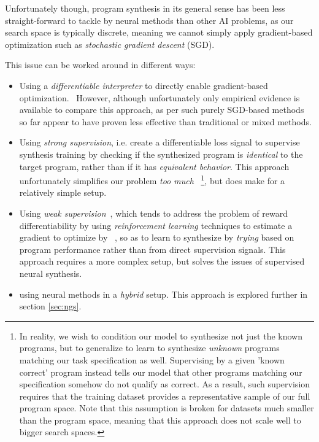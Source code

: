 \documentclass{article}
\begin{document}
Unfortunately though, program synthesis in its general sense has been less straight-forward to tackle by neural methods than other AI problems,
as our search space is typically discrete, meaning we cannot simply apply gradient-based optimization such as \emph{stochastic gradient descent} (SGD).~\citep{nps}

This issue can be worked around in different ways:
\begin{itemize}
    \item Using a \emph{differentiable interpreter} to directly enable gradient-based optimization.~\citep{forth,terpret,houdini,feser2016differentiable,rocktaschel2017end}
        However, although unfortunately only empirical evidence is available to compare this approach, as per \citet{terpret} such purely SGD-based methods so far appear to have proven less effective than traditional or mixed methods.
    \item Using \emph{strong supervision}, i.e. create a differentiable loss signal
        to supervise synthesis training by checking if the synthesized program is \emph{identical} to the target program,
        rather than if it has \emph{equivalent behavior}.
        This approach unfortunately simplifies our problem \emph{too much}%
        ~\footnote{
            In reality, we wish to condition our model to synthesize not just the known programs,
            but to generalize to learn to synthesize \emph{unknown} programs matching our task specification as well.
            Supervising by a given 'known correct' program instead tells our model that other programs matching our specification somehow do not qualify as correct.
            As a result, such supervision requires that the training dataset provides a representative sample of our full program space.
            Note that this assumption is broken for datasets much smaller than the program space,
            meaning that this approach does not scale well to bigger search spaces.
        }, but does make for a relatively simple setup.
    \item Using \emph{weak supervision}~\citep{mapo},
        which tends to address the problem of reward differentiability by using \emph{reinforcement learning} techniques to estimate a gradient to optimize by%
        ~\citep{chen2017towards,bunel2018leveraging,xu2019neural,camacho2019towards},
        so as to learn to synthesize by \emph{trying} based on program performance rather than from direct supervision signals.
        This approach requires a more complex setup, but solves the issues of supervised neural synthesis.
    \item using neural methods in a \emph{hybrid} setup. This approach is explored further in section \ref{sec:ngs}.
\end{itemize}
\end{document}
